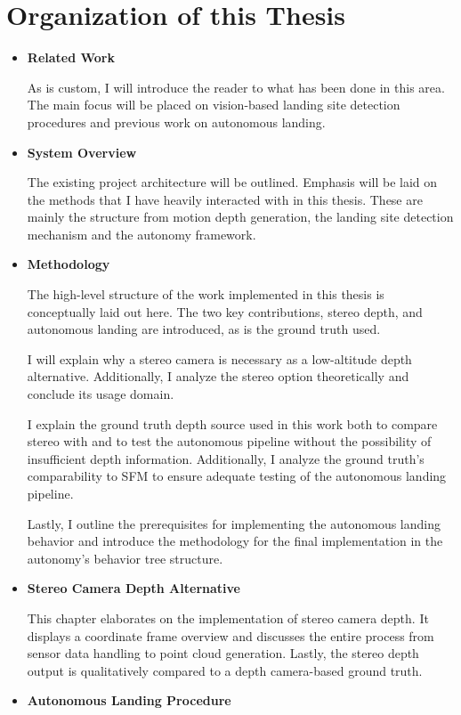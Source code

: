 \section{Organization of this Thesis}
\begin{itemize}
    \item \textbf{Related Work}

    As is custom, I will introduce the reader to what has been done in this area. The main focus will be placed on vision-based landing site detection procedures and previous work on autonomous landing. 
    \item \textbf{System Overview}

    The existing project architecture will be outlined. Emphasis will be laid on the methods that I have heavily interacted with in this thesis. These are mainly the structure from motion depth generation, the landing site detection mechanism and the autonomy framework.
    \item \textbf{Methodology}

    The high-level structure of the work implemented in this thesis is conceptually laid out here. The two key contributions, stereo depth, and autonomous landing are introduced, as is the ground truth used.

    I will explain why a stereo camera is necessary as a low-altitude depth alternative. Additionally, I analyze the stereo option theoretically and conclude its usage domain.

    I explain the ground truth depth source used in this work both to compare stereo with and to test the autonomous pipeline without the possibility of insufficient depth information. Additionally, I analyze the ground truth's comparability to SFM to ensure adequate testing of the autonomous landing pipeline.

    Lastly, I outline the prerequisites for implementing the autonomous landing behavior and introduce the methodology for the final implementation in the autonomy's behavior tree structure.

    \item \textbf{Stereo Camera Depth Alternative}

    This chapter elaborates on the implementation of stereo camera depth. It displays a coordinate frame overview and discusses the entire process from sensor data handling to point cloud generation. Lastly, the stereo depth output is qualitatively compared to a depth camera-based ground truth.
    \item \textbf{Autonomous Landing Procedure}
    

\end{itemize}
